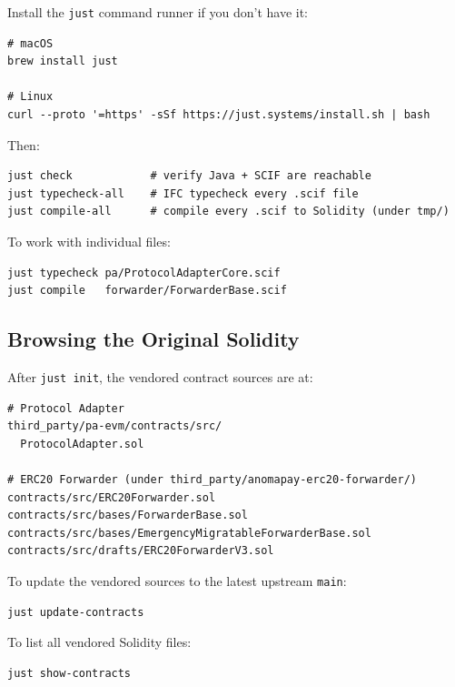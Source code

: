 \documentclass[11pt,a4paper]{article}
\begin{document}
Install the \texttt{just} command runner if you don't have it:

\begin{verbatim}
# macOS
brew install just

# Linux
curl --proto '=https' -sSf https://just.systems/install.sh | bash
\end{verbatim}

Then:

\begin{verbatim}
just check            # verify Java + SCIF are reachable
just typecheck-all    # IFC typecheck every .scif file
just compile-all      # compile every .scif to Solidity (under tmp/)
\end{verbatim}

To work with individual files:

\begin{verbatim}
just typecheck pa/ProtocolAdapterCore.scif
just compile   forwarder/ForwarderBase.scif
\end{verbatim}

\subsection{Browsing the Original Solidity}

After \texttt{just init}, the vendored contract sources are at:

\begin{small}
\begin{verbatim}
# Protocol Adapter
third_party/pa-evm/contracts/src/
  ProtocolAdapter.sol

# ERC20 Forwarder (under third_party/anomapay-erc20-forwarder/)
contracts/src/ERC20Forwarder.sol
contracts/src/bases/ForwarderBase.sol
contracts/src/bases/EmergencyMigratableForwarderBase.sol
contracts/src/drafts/ERC20ForwarderV3.sol
\end{verbatim}
\end{small}

To update the vendored sources to the latest upstream \texttt{main}:

\begin{verbatim}
just update-contracts
\end{verbatim}

To list all vendored Solidity files:

\begin{verbatim}
just show-contracts
\end{verbatim}
\end{document}
